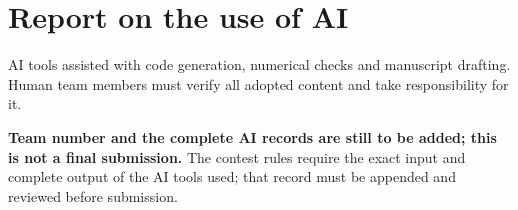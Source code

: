 \documentclass[11pt,a4paper]{article}
\begin{document}
\smallskip\small
\section*{Report on the use of AI}
AI tools assisted with code generation, numerical checks and manuscript drafting. Human team members must verify all adopted content and take responsibility for it.

\textbf{Team number and the complete AI records are still to be added; this is not a final submission.} The contest rules require the exact input and complete output of the AI tools used; that record must be appended and reviewed before submission.
\endgroup
\end{document}
